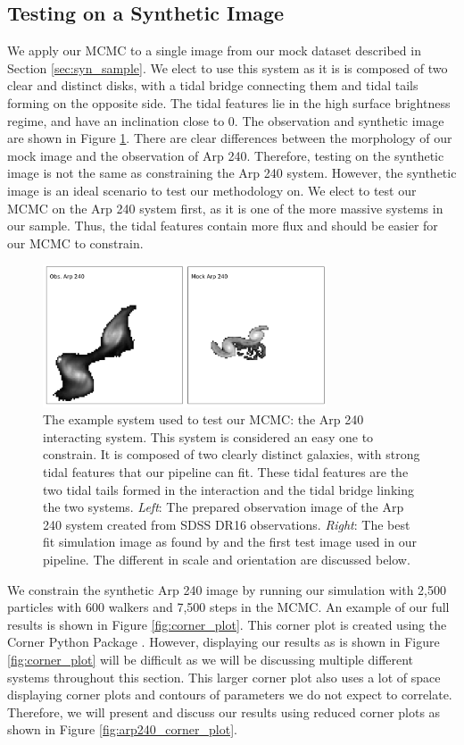 \subsection{Testing on a Synthetic Image}
We apply our MCMC to a single image from our mock dataset described in Section \ref{sec:syn_sample}. We elect to use this system as it is is composed of two clear and distinct disks, with a tidal bridge connecting them and tidal tails forming on the opposite side. The tidal features lie in the high surface brightness regime, and have an inclination close to 0. The observation and synthetic image are shown in Figure \ref{fig:arp240}. There are clear differences between the morphology of our mock image and the observation of Arp 240. Therefore, testing on the synthetic image is not the same as constraining the Arp 240 system. However, the synthetic image is an ideal scenario to test our methodology on. We elect to test our MCMC on the Arp 240 system first, as it is one of the more massive systems in our sample. Thus, the tidal features contain more flux and should be easier for our MCMC to constrain.

\begin{figure}
    \centering
    \includegraphics[width=0.75\textwidth]{Chapter1/figures/arp240-obs-sim.pdf}
    \caption{The example system used to test our MCMC: the Arp 240 interacting system. This system is considered an easy one to constrain. It is composed of two clearly distinct galaxies, with strong tidal features that our pipeline can fit. These tidal features are the two tidal tails formed in the interaction and the tidal bridge linking the two systems. \textit{Left}: The prepared observation image of the Arp 240 system created from SDSS DR16 observations. \textit{Right}: The best fit simulation image as found by \citet{2016MNRAS.459..720H} and the first test image used in our pipeline. The different in scale and orientation are discussed below.}
    \label{fig:arp240}
\end{figure}

We constrain the synthetic Arp 240 image by running our simulation with 2,500 particles with 600 walkers and 7,500 steps in the MCMC. An example of our full results is shown in Figure \ref{fig:corner_plot}. This corner plot is created using the Corner Python Package \citep{corner}. However, displaying our results as is shown in Figure \ref{fig:corner_plot} will be difficult as we will be discussing multiple different systems throughout this section. This larger corner plot also uses a lot of space displaying corner plots and contours of parameters we do not expect to correlate. Therefore, we will present and discuss our results using reduced corner plots as shown in Figure \ref{fig:arp240_corner_plot}.

